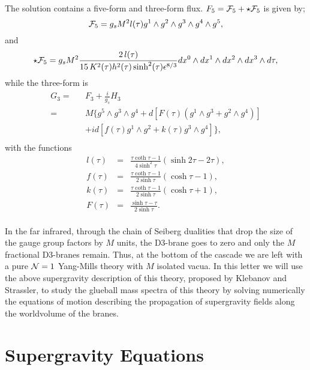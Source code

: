 \documentclass[12pt,epsf,a4paper]{article}
\begin{document}
The solution contains a five-form and three-form flux.  $F_5 = {\cal F}_5 + 
\star {\cal F}_5$ is  given by;
\begin{equation}
{\cal F}_5=  g_s M^2 l(\tau) g^1 \wedge g^2 \wedge g^3 \wedge g^4 \wedge g^5, 
\label{f5}
\end{equation}
and   
\begin{equation}
\star {\cal F}_5 = g_s M^2 \frac {2 \, l(\tau)}{15 \, K^2(\tau) h^2(\tau) \sinh^2(\tau)
\epsilon^{8/3}} dx^0 \wedge dx^1 \wedge dx^2 \wedge dx^3 \wedge d \tau,
\label{15}
\end{equation}
while the three-form is
\begin{eqnarray}
G_3= & &F_3 +\frac{i}{g_s}H_3\\
   = & & M \big\{ g^5\wedge g^3 \wedge g^4 + d[ F(\tau) (g^1 \wedge g^3 + g^2 \wedge g^4)]
\nonumber \\
   & & + i d[f(\tau) g^1 \wedge g^2 + k(\tau) g^3 \wedge g^4] \big\}, \nonumber \\
\end{eqnarray}
with the functions
\begin{eqnarray}
l(\tau)& = & \frac {\tau \coth \tau -1}{4 \sinh^2 \tau} (\sinh 2 \tau - 2 \tau), \nonumber\\
f(\tau)& = & \frac {\tau \coth \tau -1}{2 \sinh \tau}   (\cosh \tau - 1), \nonumber\\
k(\tau)& = & \frac {\tau \coth \tau -1}{2 \sinh \tau}   (\cosh \tau + 1), \nonumber\\
F(\tau)& = & \frac {\sinh \tau - \tau}{2 \sinh \tau}. \nonumber\\
\label{16}
\end{eqnarray} 
  
In the far infrared, through the chain of Seiberg dualities that drop the size of the 
gauge group factors by $M$ units, the D3-brane  goes to  zero and  
only the $M$ fractional D3-branes remain. Thus, at the bottom of the cascade we are left 
with a pure ${\cal N}=1$ Yang-Mills theory 
with $M$ isolated vacua. In this letter we will use the above 
supergravity description of this theory, proposed by Klebanov and Strassler, to study the 
glueball mass spectra of this theory by solving numerically the equations of motion describing 
the propagation of supergravity fields along the worldvolume of the branes.




\section{Supergravity Equations}
\end{document}
